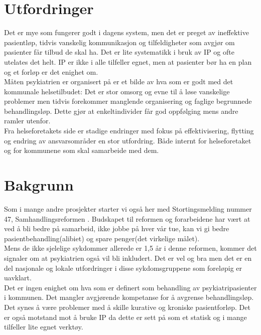\documentclass[11pt]{report} %
\begin{document}
                \section{Utfordringer}\label{sec:ov_utf}
                  Det er mye som fungerer godt i dagens system, men det er preget av ineffektive pasientløp, tidvis vanskelig kommunikasjon og tilfeldigheter som avgjør om pasienter får tilbud de skal ha. Det er lite systematikk i bruk av IP og ofte utelates det helt. IP er ikke i alle tilfeller egnet, men at pasienter bør ha en plan og et forløp er det enighet om. \\
                  Måten psykiatrien er organisert på er et bilde av hva som er godt med det kommunale helsetilbudet: Det er stor omsorg og evne til å løse vanskelige problemer men tidvis forekommer manglende organisering og faglige begrunnede behandlingsløp\label{stor_vilje_til_hjelp}. Dette gjør at enkeltindivider får god oppfølging mens andre ramler utenfor. \\
                  Fra helseforetakets side er stadige endringer med fokus på effektivisering, flytting og endring av ansvarsområder en stor utfordring. Både internt for helseforetaket og for kommunene som skal samarbeide med dem.\\

                \section{Bakgrunn}\label{sec:ov_bakg}
                  Som i mange andre prosjekter starter vi også her med Stortingsmelding nummer 47, Samhandlingsreformen
                  \cite{Stmld47}. Budskapet til reformen og forarbeidene har vært at ved å bli bedre på samarbeid, ikke jobbe på hver vår tue, kan vi gi bedre pasientbehandling(alibiet) og spare penger(det virkelige målet). \\
                  Mens de ikke sjelelige sykdommer allerede er 1,5 år i denne reformen, kommer det signaler om at psykiatrien også vil bli inkludert. Det er vel og bra men det er en del nasjonale og lokale utfordringer i disse sykdomsgruppene som foreløpig er uavklart. \\
                  Det er ingen enighet om hva som er definert som behandling av psykiatripasienter i kommunen. Det mangler avgjørende kompetanse for å avgrense behandlingsløp. Det synes å være problemer med å skille kurative og kroniske pasientforløp. Det er også motstand mot å bruke IP da dette er sett på som et statisk og i mange tilfeller lite egnet verktøy. \\
\end{document}
